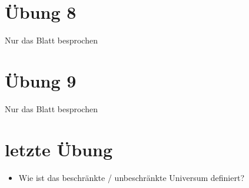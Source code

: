 \documentclass[12pt, a4paper]{article}
\begin{document}
\section*{Übung 8}

Nur das Blatt besprochen

\section*{Übung 9}

Nur das Blatt besprochen


\section*{letzte Übung}

\begin{itemize}
\item Wie ist das beschränkte / unbeschränkte Universum definiert?
\end{itemize}
\end{document}
